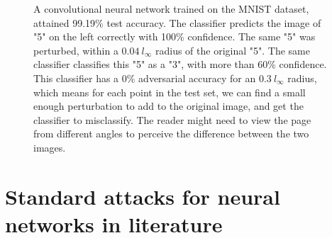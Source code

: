 \documentclass[12pt, oneside]{book}
\begin{document}
\begin{figure}[!h]
    \centering
    \qquad
     \caption{A
    convolutional neural network trained on the MNIST dataset, attained 99.19\%
    test accuracy. The classifier predicts the image of "5" on the left
    correctly with 100\% confidence. The same "5" was perturbed, within a
    $0.04~l_\infty$ radius of the original "5". The same classifier classifies
    this "5" as a "3", with more than 60\% confidence. This classifier has a 0\%
    adversarial accuracy for an $0.3~l_\infty$ radius, which means for each
    point in the test set, we can find a small enough perturbation to add to the
    original image, and get the classifier to misclassify. The reader might need
    to view the page from different angles to perceive the difference between
    the two images.}
    \label{fig:adversarial-example-5}
\end{figure}

\section{Standard attacks for neural networks in literature}
\end{document}
